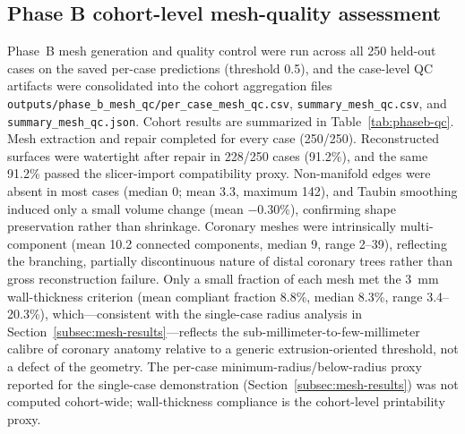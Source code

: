 \documentclass[anonymous]{iopjournal}
\begin{document}
\subsection{Phase B cohort-level mesh-quality assessment}
\label{subsec:phaseb-plan}

Phase~B mesh generation and quality control were run across all 250 held-out cases on the saved per-case predictions (threshold 0.5), and the case-level QC artifacts were consolidated into the cohort aggregation files \texttt{outputs/phase\_b\_mesh\_qc/per\_case\_mesh\_qc.csv}, \texttt{summary\_mesh\_qc.csv}, and \texttt{summary\_mesh\_qc.json}. Cohort results are summarized in Table~\ref{tab:phaseb-qc}. Mesh extraction and repair completed for every case (250/250). Reconstructed surfaces were watertight after repair in 228/250 cases (91.2\%), and the same 91.2\% passed the slicer-import compatibility proxy. Non-manifold edges were absent in most cases (median 0; mean 3.3, maximum 142), and Taubin smoothing induced only a small volume change (mean $-0.30\%$), confirming shape preservation rather than shrinkage. Coronary meshes were intrinsically multi-component (mean 10.2 connected components, median 9, range 2--39), reflecting the branching, partially discontinuous nature of distal coronary trees rather than gross reconstruction failure. Only a small fraction of each mesh met the \SI{3}{mm} wall-thickness criterion (mean compliant fraction 8.8\%, median 8.3\%, range 3.4--20.3\%), which---consistent with the single-case radius analysis in Section~\ref{subsec:mesh-results}---reflects the sub-millimeter-to-few-millimeter calibre of coronary anatomy relative to a generic extrusion-oriented threshold, not a defect of the geometry. The per-case minimum-radius/below-radius proxy reported for the single-case demonstration (Section~\ref{subsec:mesh-results}) was not computed cohort-wide; wall-thickness compliance is the cohort-level printability proxy.
\end{document}
